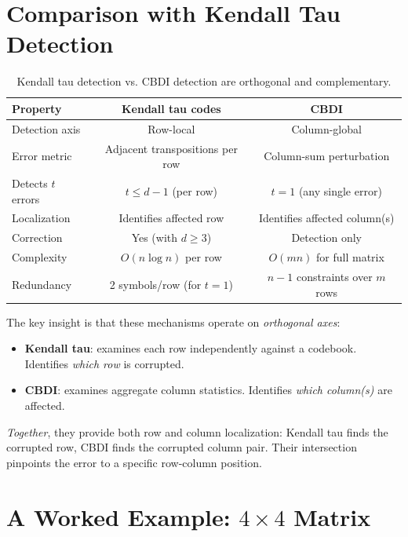 \documentclass[11pt]{article}
\begin{document}
\section{Comparison with Kendall Tau Detection}
\label{sec:comparison}

\begin{table}[h]
\centering
\renewcommand{\arraystretch}{1.3}
\begin{tabular}{lcc}
\toprule
Property & Kendall tau codes & CBDI \\
\midrule
Detection axis & Row-local & Column-global \\
Error metric & Adjacent transpositions per row & Column-sum perturbation \\
Detects $t$ errors & $t \leq d-1$ (per row) & $t = 1$ (any single error) \\
Localization & Identifies affected row & Identifies affected column(s) \\
Correction & Yes (with $d \geq 3$) & Detection only \\
Complexity & $O(n \log n)$ per row & $O(mn)$ for full matrix \\
Redundancy & 2 symbols/row (for $t=1$) & $n-1$ constraints over $m$ rows \\
\bottomrule
\end{tabular}
\caption{Kendall tau detection vs. CBDI detection are orthogonal and complementary.}
\label{tab:comparison}
\end{table}

The key insight is that these mechanisms operate on \emph{orthogonal axes}:
\begin{itemize}
\item \textbf{Kendall tau}: examines each row independently against a codebook. Identifies \emph{which row} is corrupted.
\item \textbf{CBDI}: examines aggregate column statistics. Identifies \emph{which column(s)} are affected.
\end{itemize}

\emph{Together}, they provide both row and column localization: Kendall tau finds the corrupted row, CBDI finds the corrupted column pair. Their intersection pinpoints the error to a specific row-column position.

\section{A Worked Example: $4 \times 4$ Matrix}
\label{sec:example}
\end{document}
